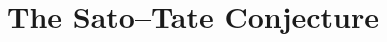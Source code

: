 \documentclass[../thesis.tex]{subfiles}
\begin{document}
\chapter{The Sato--Tate Conjecture}

\end{document}
